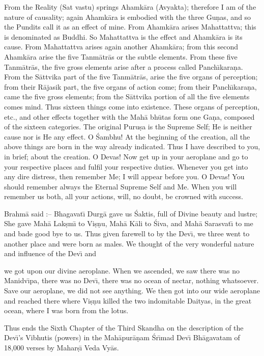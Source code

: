 From the Reality (Sat vastu) springs Ahamk\=ara (Avyakta); therefore I am of the nature of causality; again Ahamk\=ara is embodied with the three Gu\d{n}as, and so the Pundits call it as an effect of mine. From Ahamk\=ara arises Mahattattva; this is denominated as Buddhi. So Mahattattva is the effect and Ahamk\=ara is its cause. From Mahattattva arises again another Ahamk\=ara; from this second Ahamk\=ara arise the five Tanm\=atr\=as or the subtle elements. From these five Tanm\=atr\=as, the five gross elements arise after a process called Panch\={\i}kara\d{n}a. From the S\=attvika part of the five Tanm\=atr\=as, arise the five organs of perception; from their R\=ajasik part, the five organs of action come; from their Panch\={\i}kara\d{n}a, came the five gross elements; from the S\=attvika portion of all the five elements comes mind. Thus sixteen things come into existence. These organs of perception, etc., and other effects together with the Mah\=a bh\=utas form one Ga\d{n}a, composed of the sixteen categories. The original Puru\d{s}a is the Supreme Self; He is neither cause nor is He any effect. O \'Sambhu! At the beginning of the creation, all the above things are born in the way already indicated. Thus I have described to you, in brief; about the creation. O Devas! Now get up in your aeroplane and go to your respective places and fulfil your respective duties. Whenever you get into any dire distress, then remember Me; I will appear before you. O Devas! You should remember always the Eternal Supreme Self and Me. When you will remember us both, all your actions, will, no doubt, be crowned with success.

Brahm\=a said :-- Bhagavat\={\i} Durg\=a gave us \'Saktis, full of Divine beauty and lustre; She gave Mah\=a Lak\d{s}m\={\i} to Vi\d{s}\d{n}u, Mah\=a K\=ali to \'Siva, and Mah\=a Sarasvat\={\i} to me and bade good bye to us. Thus given farewell to by the Dev\={\i}, we three went to another place and were born as males. We thought of the very wonderful nature and influence of the Dev\={\i} and

we got upon our divine aeroplane. When we ascended, we saw there was no Manidv\={\i}pa, there was no Dev\={\i}, there was no ocean of nectar, nothing whatsoever. Save our aeroplane, we did not see anything. We then got into our wide aeroplane and reached there where Vi\d{s}\d{n}u killed the two indomitable Daityas, in the great ocean, where I was born from the lotus.

Thus ends the Sixth Chapter of the Third Skandha on the description of the Dev\={\i}'s Vibhutis (powers) in the Mah\=apur\=a\d{n}am \'Sr\={\i}mad Dev\={\i} Bh\=agavatam of 18,000 verses by Mahar\d{s}\={\i} Veda Vy\=as.



